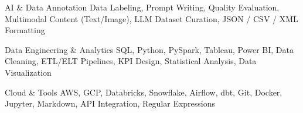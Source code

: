 
\begin{cvskills}

  \cvskill
    {AI \& Data Annotation} 
    {Data Labeling, Prompt Writing, Quality Evaluation, Multimodal Content (Text/Image),
\newline LLM Dataset Curation, JSON / CSV / XML Formatting}

  \cvskill
    {Data Engineering \& Analytics} 
    {SQL, Python, PySpark, Tableau, Power BI, Data Cleaning, ETL/ELT Pipelines, KPI Design,\newline
     Statistical Analysis, Data Visualization}

  \cvskill
    {Cloud \& Tools} 
    {AWS, GCP, Databricks, Snowflake, Airflow, dbt, Git, Docker, Jupyter, Markdown,\newline
     API Integration, Regular Expressions}

\end{cvskills}

